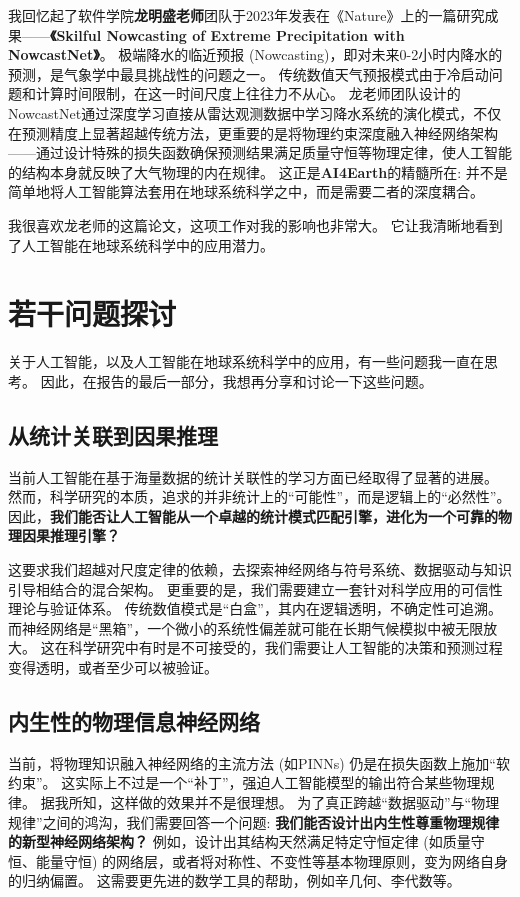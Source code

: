 \documentclass[12pt, a4paper]{article}
\begin{document}
我回忆起了软件学院\textbf{龙明盛老师}团队于2023年发表在《Nature》上的一篇研究成果——\textbf{《Skilful Nowcasting of Extreme Precipitation with NowcastNet》}。
极端降水的临近预报 (Nowcasting)，即对未来0-2小时内降水的预测，是气象学中最具挑战性的问题之一。
传统数值天气预报模式由于冷启动问题和计算时间限制，在这一时间尺度上往往力不从心。
龙老师团队设计的NowcastNet通过深度学习直接从雷达观测数据中学习降水系统的演化模式，不仅在预测精度上显著超越传统方法，更重要的是将物理约束深度融入神经网络架构——通过设计特殊的损失函数确保预测结果满足质量守恒等物理定律，使人工智能的结构本身就反映了大气物理的内在规律。
这正是\textbf{AI4Earth}的精髓所在: 并不是简单地将人工智能算法套用在地球系统科学之中，而是需要二者的深度耦合。

我很喜欢龙老师的这篇论文，这项工作对我的影响也非常大。
它让我清晰地看到了人工智能在地球系统科学中的应用潜力。



\section{若干问题探讨}

关于人工智能，以及人工智能在地球系统科学中的应用，有一些问题我一直在思考。
因此，在报告的最后一部分，我想再分享和讨论一下这些问题。

\subsection{从统计关联到因果推理}

当前人工智能在基于海量数据的统计关联性的学习方面已经取得了显著的进展。
然而，科学研究的本质，追求的并非统计上的“可能性”，而是逻辑上的“必然性”。
因此，\textbf{我们能否让人工智能从一个卓越的统计模式匹配引擎，进化为一个可靠的物理因果推理引擎？}

这要求我们超越对尺度定律的依赖，去探索神经网络与符号系统、数据驱动与知识引导相结合的混合架构。
更重要的是，我们需要建立一套针对科学应用的可信性理论与验证体系。
传统数值模式是“白盒”，其内在逻辑透明，不确定性可追溯。
而神经网络是“黑箱”，一个微小的系统性偏差就可能在长期气候模拟中被无限放大。
这在科学研究中有时是不可接受的，我们需要让人工智能的决策和预测过程变得透明，或者至少可以被验证。

\subsection{内生性的物理信息神经网络}

当前，将物理知识融入神经网络的主流方法 (如PINNs) 仍是在损失函数上施加“软约束”。
这实际上不过是一个“补丁”，强迫人工智能模型的输出符合某些物理规律。
据我所知，这样做的效果并不是很理想。
为了真正跨越“数据驱动”与“物理规律”之间的鸿沟，我们需要回答一个问题: \textbf{我们能否设计出内生性尊重物理规律的新型神经网络架构？}
例如，设计出其结构天然满足特定守恒定律 (如质量守恒、能量守恒) 的网络层，或者将对称性、不变性等基本物理原则，变为网络自身的归纳偏置。
这需要更先进的数学工具的帮助，例如辛几何、李代数等。
\end{document}
